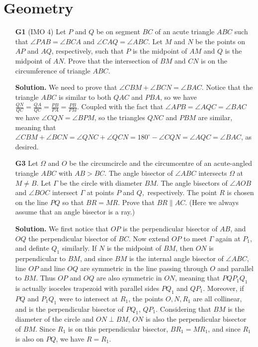 \documentclass[11pt,a4paper]{article}
\begin{document}
\section*{Geometry}
\begin{enumerate}
	\item [\textbf{G1}] (IMO 4) Let $P$ and $Q$ be on segment $BC$ of an acute triangle $ABC$ such that $\angle PAB=\angle BCA$ and $\angle CAQ=\angle ABC$. Let $M$ and $N$ be the points on $AP$ and $AQ$, respectively, such that $P$ is the midpoint of $AM$ and $Q$ is the midpoint of $AN$. Prove that the intersection of $BM$ and $CN$ is on the circumference of triangle $ABC$.
	
	\textbf{Solution.} We need to prove that $\angle CBM + \angle BCN = \angle BAC$. 
	Notice that the triangle $ABC$ is similar to both $QAC$ and $PBA$, so we have $\frac{QN}{QC}=\frac{QA}{QC}=\frac{PB}{PA}=\frac{PB}{PM}$. 
	Coupled with the fact that $\angle APB = \angle AQC = \angle BAC$ we have $\angle CQN = \angle BPM$, so the triangles $QNC$ and $PBM$ are similar, meaning that $\angle CBM + \angle BCN = \angle QNC + \angle QCN = 180^{\circ} - \angle CQN = \angle AQC = \angle BAC$, as desired. 
	
	\item [\textbf{G3}] Let $\Omega$ and $O$ be the circumcircle and the circumcentre of an acute-angled triangle $ABC$ with $AB > BC$. The angle bisector of $\angle ABC$ intersects $\Omega$ at $M \ne B$. Let $\Gamma$ be the circle with diameter $BM$. The angle bisectors of $\angle AOB$ and $\angle BOC$ intersect $\Gamma$ at points $P$ and $Q,$ respectively. The point $R$ is chosen on the line $P Q$ so that $BR = MR$. Prove that $BR\parallel AC$.
	(Here we always assume that an angle bisector is a ray.)
	
	\textbf{Solution.} We first notice that $OP$ is the perpendicular bisector of $AB$, and $OQ$ the perpendicular bisector of $BC$. Now extend $OP$ to meet $\Gamma$ again at $P_1$, and definte $Q_1$ similarly. 
	If $N$ is the midpoint of $BM$, then $ON$ is perpendicular to $BM$, and since $BM$ is the internal angle bisector of $\angle ABC$, line $OP$ and line $OQ$ are symmetric in the line passing through $O$ and parallel to $BM$. Thus $OP$ and $OQ$ are also symmetric in $ON$, meaning that $PQP_1Q_1$ is actually isoceles trapezoid with parallel sides $PQ_1$ and $QP_1$. 
	Moreover, if $PQ$ and $P_1Q_1$ were to intersect at $R_1$, the points $O, N, R_1$ are all collinear, and is the perpendicular bisector of $PQ_1$, $QP_1$. Considering that $BM$ is the diameter of the circle and $ON\perp BM$, $ON$ is also the perpendicular bisector of $BM$. Since $R_1$ is on this perpendicular bisector, $BR_1=MR_1$, and since $R_1$ is also on $PQ$, we have $R=R_1$. 
	

\end{enumerate}
\end{document}
